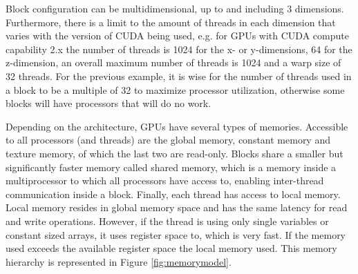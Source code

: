 
Block configuration can be multidimensional, up to and including 3 dimensions.
Furthermore, there is a limit to the amount of threads in each dimension that varies with the version of CUDA being used, e.g. for GPUs with CUDA compute capability 2.x  the number of threads is 1024 for the x- or y-dimensions, 64 for the z-dimension, an overall maximum number of threads is 1024 and a warp size of 32 threads.
For the previous example, it is wise for the number of threads used in a block to be a multiple of 32 to maximize processor utilization, otherwise some blocks will have processors that will do no work.

Depending on the architecture, GPUs have several types of memories.
Accessible to all processors (and threads) are the global memory, constant memory and texture memory, of which the last two are read-only.
Blocks share a smaller but significantly faster memory called shared memory, which is a memory inside a multiprocessor to which all processors have access to, enabling inter-thread communication inside a block.
Finally, each thread has access to local memory.
Local memory resides in global memory space and has the same latency for read and write operations.
However, if the thread is using only single variables or constant sized arrays, it uses register space to, which is very fast.
If the memory used exceeds the available register space the local memory used.
This memory hierarchy is represented in Figure \ref{fig:memorymodel}.

